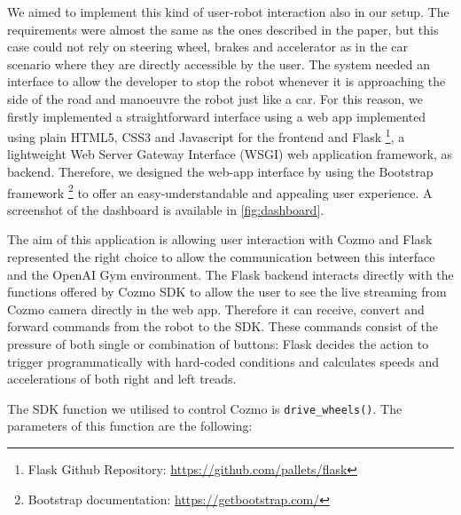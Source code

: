 We aimed to implement this kind of user-robot interaction also in our setup.
The requirements were almost the same as the ones described in the paper, but this case could not rely on steering wheel, brakes and accelerator as in the car scenario where they are directly accessible by the user.
The system needed an interface to allow the developer to stop the robot whenever it is approaching the side of the road and manoeuvre the robot just like a car.
For this reason, we firstly implemented a straightforward interface using a web app implemented using plain HTML5, CSS3 and Javascript for the frontend and Flask \footnote{Flask Github Repository: \href{https://github.com/pallets/flask}{https://github.com/pallets/flask}}, a lightweight Web Server Gateway Interface (WSGI) web application framework, as backend.
Therefore, we designed the web-app interface by using the Bootstrap framework \footnote{Bootstrap documentation: \href{https://getbootstrap.com/}{https://getbootstrap.com/}} to offer an easy-understandable and appealing user experience. A screenshot of the dashboard is available in \vref{fig:dashboard}.

The aim of this application is allowing user interaction with Cozmo and Flask represented the right choice to allow the communication between this interface and the OpenAI Gym environment.
The Flask backend interacts directly with the functions offered by Cozmo SDK to allow the user to see the live streaming from Cozmo camera directly in the web app.
Therefore it can receive, convert and forward commands from the robot to the SDK.
These commands consist of the pressure of both single or combination of buttons: Flask decides the action to trigger programmatically with hard-coded conditions and calculates speeds and accelerations of both right and left treads.

The SDK function we utilised to control Cozmo is \texttt{drive\_wheels()}.
The parameters of this function are the following:

